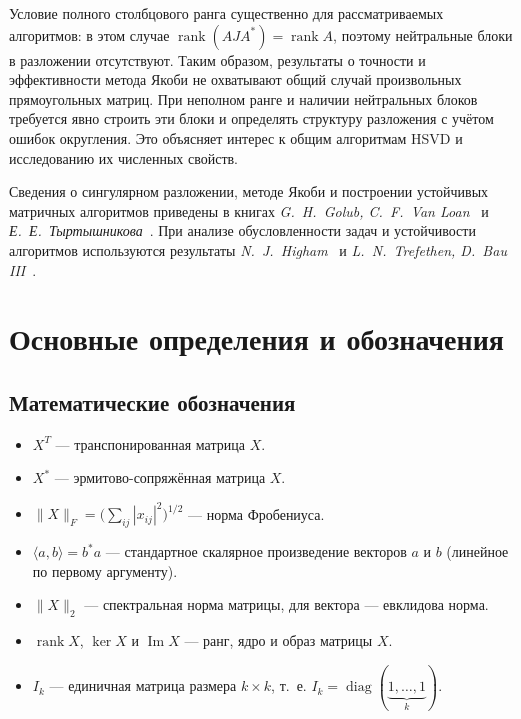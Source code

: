 \documentclass[a4paper,12pt]{article}
\DeclareMathOperator{\rank}{rank}
\DeclareMathOperator{\diag}{diag}
\theoremstyle{csstyle}
\DeclareMathOperator{\im}{Im}
\begin{document}
Условие полного столбцового ранга существенно для рассматриваемых
алгоритмов: в этом случае $\rank(AJA^*)=\rank A$,
поэтому нейтральные блоки в разложении отсутствуют.
Таким образом, результаты о точности и эффективности метода Якоби
не охватывают общий случай произвольных прямоугольных матриц.
При неполном ранге и наличии нейтральных блоков требуется явно строить
эти блоки и определять структуру разложения с учётом ошибок округления.
Это объясняет интерес к общим алгоритмам HSVD
и исследованию их численных свойств.

Сведения о сингулярном разложении, методе Якоби и построении
устойчивых матричных алгоритмов приведены в книгах
\textit{G.~H.~Golub, C.~F.~Van Loan}~\cite{Golub}
и \textit{Е.~Е.~Тыртышникова}~\cite{Tyrtyshnikov}.
При анализе обусловленности задач и устойчивости алгоритмов
используются результаты \textit{N.~J.~Higham}~\cite{HighamAccuracy}
и \textit{L.~N.~Trefethen, D.~Bau III}~\cite{TrefethenBauNLA}.


\section{Основные определения и обозначения}
\label{sec:definitions}
\begingroup
{}
\subsection*{Математические обозначения}

\begin{itemize}
    \item $X^T$ --- транспонированная матрица $X$.
    \item $X^*$ --- эрмитово-сопряжённая матрица $X$.
    \item $\|X\|_F = \bigl(\sum_{ij}|x_{ij}|^2\bigr)^{1/2}$ --- норма Фробениуса.
    \item $\langle a, b\rangle = b^*a$ --- стандартное скалярное произведение векторов $a$ и $b$ (линейное по первому аргументу).
    \item $\|X\|_2$ --- спектральная норма матрицы, для вектора --- евклидова норма.
    \item $\rank X$, $\ker X$ и $\im X$ --- ранг, ядро и образ матрицы $X$.
    \item $I_k$ --- единичная матрица размера $k\times k$, т.~е. $I_k = \diag(\underbrace{1, \dots, 1}_k)$.

\end{itemize}
\end{document}
